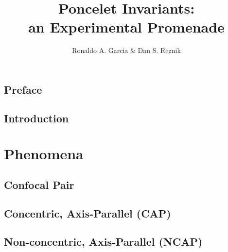 \documentclass{book}
\begin{document}
\title{Poncelet Invariants:\\an Experimental Promenade}

\author{Ronaldo A. Garcia \& Dan S. Reznik} 
\maketitle
\chapter*{Preface}


\chapter{Introduction}
\label{chap:01-intro}


\part{ Phenomena}

\chapter{Confocal Pair}
\label{chap:02-n3-confocal}


\chapter{Concentric, Axis-Parallel (CAP)}
\label{chap:03-n3-cap}


\chapter{Non-concentric, Axis-Parallel (NCAP)}
\label{chap:04-n3-ncap}

\end{document}
